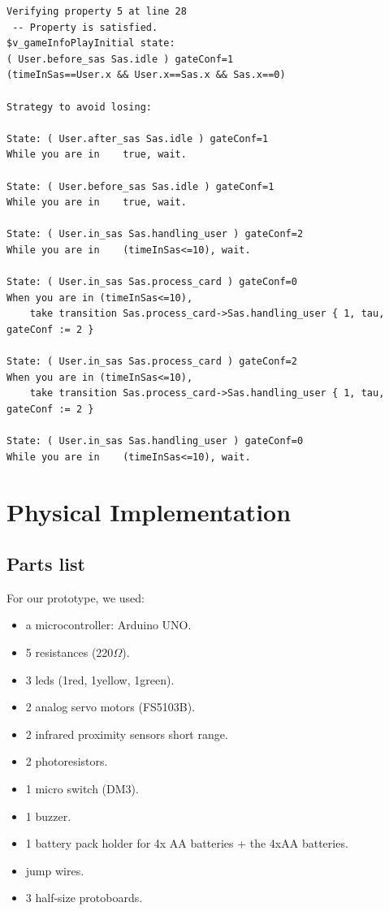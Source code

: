\begin{verbatim}
Verifying property 5 at line 28
 -- Property is satisfied.
$v_gameInfoPlayInitial state:
( User.before_sas Sas.idle ) gateConf=1 
(timeInSas==User.x && User.x==Sas.x && Sas.x==0)

Strategy to avoid losing:

State: ( User.after_sas Sas.idle ) gateConf=1 
While you are in	true, wait.

State: ( User.before_sas Sas.idle ) gateConf=1 
While you are in	true, wait.

State: ( User.in_sas Sas.handling_user ) gateConf=2 
While you are in	(timeInSas<=10), wait.

State: ( User.in_sas Sas.process_card ) gateConf=0 
When you are in (timeInSas<=10), 
	take transition Sas.process_card->Sas.handling_user { 1, tau, gateConf := 2 }

State: ( User.in_sas Sas.process_card ) gateConf=2 
When you are in (timeInSas<=10), 
	take transition Sas.process_card->Sas.handling_user { 1, tau, gateConf := 2 }

State: ( User.in_sas Sas.handling_user ) gateConf=0 
While you are in	(timeInSas<=10), wait.
\end{verbatim}

\newpage
\section{Physical Implementation}
\subsection{Parts list}
For our prototype, we used:
\begin{itemize}
	\item a microcontroller: Arduino UNO.
	\item 5 resistances (220$\Omega$).
    \item 3 leds (1red, 1yellow, 1green).
    \item 2 analog servo motors (FS5103B).
    \item 2 infrared proximity sensors short range.
    \item 2 photoresistors.
    \item 1 micro switch (DM3).
    \item 1 buzzer.
    \item 1 battery pack holder for 4x AA batteries + the 4xAA batteries.
    \item jump wires.
    \item 3 half-size protoboards.
\end{itemize}

